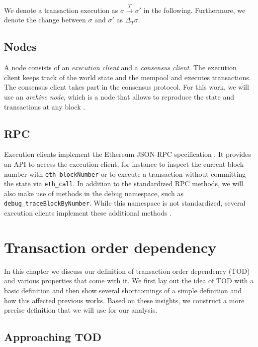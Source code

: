 \documentclass[draft,final]{vutinfth} %
\begin{document}
We denote a transaction execution as $\sigma \xrightarrow{T} \sigma\prime$ in the following. Furthermore, we denote the change between $\sigma$ and $\sigma\prime$ as $\Delta_T\sigma$.

\section{Nodes}

A node consists of an \emph{execution client} and a \emph{consensus client}. The execution client keeps track of the world state and the mempool and executes transactions. The consensus client takes part in the consensus protocol. For this work, we will use an \emph{archive node}, which is a node that allows to reproduce the state and transactions at any block \cite{noauthor_nodes_2024}.

\section{RPC}

Execution clients implement the Ethereum JSON-RPC specification \cite{noauthor_ethereum_2024}. It provides an API to access the execution client, for instance to inspect the current block number with \verb|eth_blockNumber| or to execute a transaction without committing the state via \verb|eth_call|. In addition to the standardized RPC methods, we will also make use of methods in the debug namespace, such as \verb|debug_traceBlockByNumber|. While this namespace is not standardized, several execution clients implement these additional methods \cite{noauthor_debug_2024}\cite{noauthor_rpc_2024}\cite{noauthor_reth_2024}.


\chapter{Transaction order dependency}

In this chapter we discuss our definition of transaction order dependency (TOD) and various properties that come with it. We first lay out the idea of TOD with a basic definition and then show several shortcomings of a simple definition and how this affected previous works. Based on these insights, we construct a more precise definition that we will use for our analysis.

\section{Approaching TOD}
\end{document}
